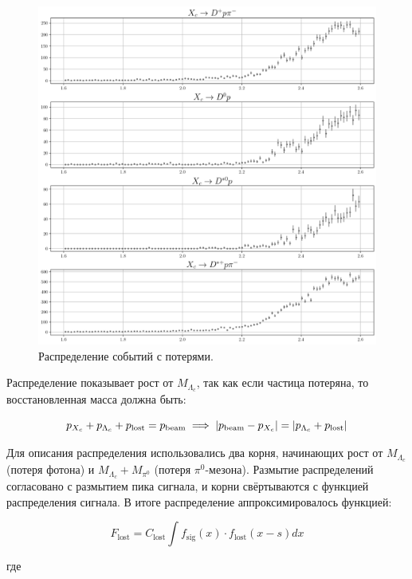 \begin{figure}[H]
    \centering
    \includegraphics[width=1\linewidth]{img/MC_sqr_bg.png}
    \caption{Распределение событий с потерями.}
    \label{MC_bg_lost}
\end{figure}

Распределение показывает рост от $M_{\Lambda_c}$, так как если частица потеряна, то восстановленная масса должна быть:

\begin{equation}
    p_{X_c} + p_{\Lambda_c} + p_{\text{lost}} = p_{\text{beam}} \implies \abs{p_{\text{beam}} - p_{X_c}} = \abs{p_{\Lambda_c} + p_{\text{lost}}}
\end{equation}

Для описания распределения использовались два корня, начинающих рост от $M_{\Lambda_c}$ (потеря фотона) и $M_{\Lambda_c} + M_{\pi^0}$ (потеря $\pi^0$-мезона). Размытие распределений согласовано с размытием пика сигнала, и корни свёртываются с функцией распределения сигнала. В итоге распределение аппроксимировалось функцией:

\begin{equation}
    F_{\text{lost}} = C_{\text{lost}} \int f_{\text{sig}}(x)\cdot f_{\text{lost}}(x-s) dx
\end{equation}

где

